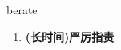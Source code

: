 
\begin{frame}
{\huge berate}
\begin{center}
\begin{enumerate}\Large
  \item \textbf{(长时间)严厉指责}
\end{enumerate}
\end{center}
\end{frame}
